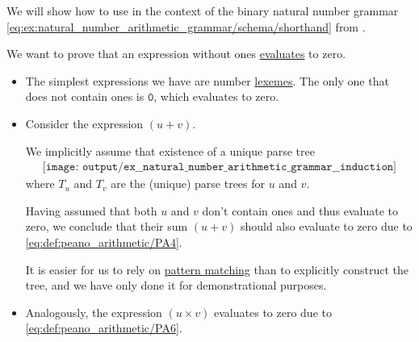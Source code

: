 \begin{example}\label{ex:natural_number_arithmetic_grammar/induction}
  We will show how to use  in the context of the binary natural number grammar \eqref{eq:ex:natural_number_arithmetic_grammar/schema/shorthand} from .

  We want to prove that an expression without ones \hyperref[rem:evaluation]{evaluates} to zero.

  \begin{itemize}
    \item The simplest expressions we have are number \hyperref[rem:abstract_syntax_tree/lexical]{lexemes}. The only one that does not contain ones is \( \mathtt{0} \), which evaluates to zero.

    \item Consider the expression \( (u + v) \).

    We implicitly assume that existence of a unique parse tree
    \begin{equation*}
      \begin{aligned}
        \texttt{[image: output/ex\_\_natural\_number\_arithmetic\_grammar\_\_induction]}
      \end{aligned}
    \end{equation*}
    where \( T_u \) and \( T_v \) are the (unique) parse trees for \( u \) and \( v \).

    Having assumed that both \( u \) and \( v \) don't contain ones and thus evaluate to zero, we conclude that their sum \( (u + v) \) should also evaluate to zero due to \ref{eq:def:peano_arithmetic/PA4}.

    It is easier for us to rely on \hyperref[rem:evaluation]{pattern matching} than to explicitly construct the tree, and we have only done it for demonstrational purposes.

    \item Analogously, the expression \( (u \times v) \) evaluates to zero due to \ref{eq:def:peano_arithmetic/PA6}.
  \end{itemize}
\end{example}
